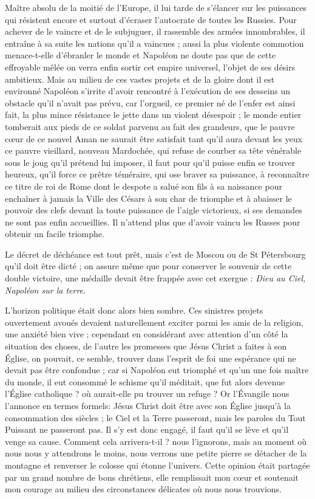 \documentclass[11pt,a4paper]{report}
\begin{document}
Maître absolu de la moitié de l'Europe, il lui tarde de s'élancer sur les puissances qui résistent encore et surtout d'écraser l'autocrate de toutes les Russies. Pour achever de le vaincre et de le subjuguer, il rassemble des armées innombrables, il entraîne à sa suite les nations qu'il a vaincues ; aussi la plus violente commotion menace-t-elle d'ébranler le monde et Napoléon ne doute pas que de cette effroyable mêlée on verra enfin sortir cet empire universel, l'objet de ses désirs ambitieux. Mais au milieu de ces vastes projets et de la gloire dont il est environné Napoléon s'irrite d'avoir rencontré à l'exécution de ses desseins un obstacle qu'il n'avait pas prévu, car l'orgueil, ce premier né de l'enfer est ainsi fait, la plus mince résistance le jette dans un violent désespoir ; le monde entier tomberait aux pieds de ce soldat parvenu au fait des grandeurs, que le pauvre cœur de ce nouvel Aman ne saurait être satisfait tant qu'il aura devant les yeux ce pauvre vieillard, nouveau Mardochée, qui refuse de courber sa tête vénérable sous le joug qu'il prétend lui imposer, il faut pour qu'il puisse enfin se trouver heureux, qu'il force ce prêtre téméraire, qui ose braver sa puissance, à reconnaître ce titre de roi de Rome dont le despote a salué son fils à sa naissance pour enchaîner à jamais la Ville des Césars à son char de triomphe et à abaisser le pouvoir des clefs devant la toute puissance de l'aigle victorieux, si ses demandes ne sont pas enfin accueillies. Il n'attend plus que d'avoir vaincu les Russes pour obtenir un facile triomphe.

Le décret de déchéance est tout prêt, mais c'est de Moscou ou de St Pétersbourg qu'il doit être dicté ; on assure même que pour conserver le souvenir de cette double victoire, une médaille devait être frappée avec cet exergue : \textit{Dieu au Ciel, Napoléon sur la terre}.

L'horizon politique était donc alors bien sombre. Ces sinistres projets ouvertement avoués devaient naturellement exciter parmi les amis de la religion, une anxiété bien vive ; cependant en considérant avec attention d'un côté la situation des choses, de l'autre les promesses que Jésus Christ a faites à son Église, on pouvait, ce semble, trouver dans l'esprit de foi une espérance qui ne devait pas être confondue ; car si Napoléon eut triomphé et qu'un une fois maître du monde, il eut consommé le schisme qu'il méditait, que fut alors devenue l'Église catholique ? où aurait-elle pu trouver un refuge ? Or l'Évangile nous l'annonce en termes formels: Jésus Christ doit être avec son Église jusqu'à la consommation des siècles ; le Ciel et la Terre passeront, mais les paroles du Tout Puissant ne passeront pas. Il s'y est donc engagé, il faut qu'il se lève et qu'il venge sa cause. Comment cela arrivera-t-il ? nous l'ignorons, mais au moment où nous nous y attendrons le moins, nous verrons une petite pierre se détacher de la montagne et renverser le colosse qui étonne l'univers. Cette opinion était partagée par un grand nombre de bons chrétiens, elle remplissait mon cœur et soutenait mon courage au milieu des circonstances délicates où nous nous trouvions.
\end{document}
